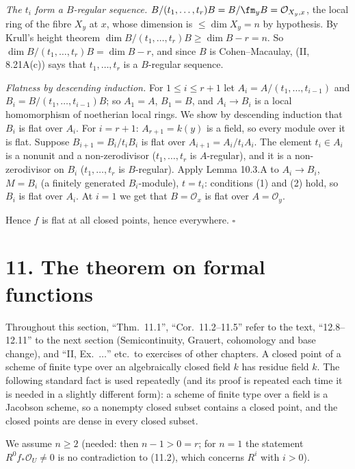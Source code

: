 \documentclass[11pt]{article}
\begin{document}
\emph{The $t_i$ form a $B$-regular sequence.} $B/(t_1,\dots,t_r)B=B/\fm_yB=\mathcal O_{X_y,x}$, the local ring of the fibre $X_y$ at $x$, whose dimension is $\le\dim X_y=n$ by hypothesis. By Krull's height theorem $\dim B/(t_1,\dots,t_r)B\ge\dim B-r=n$. So $\dim B/(t_1,\dots,t_r)B=\dim B-r$, and since $B$ is Cohen--Macaulay, (II, 8.21A(c)) says that $t_1,\dots,t_r$ is a $B$-regular sequence.

\emph{Flatness by descending induction.} For $1\le i\le r+1$ let $A_i=A/(t_1,\dots,t_{i-1})$ and $B_i=B/(t_1,\dots,t_{i-1})B$; so $A_1=A$, $B_1=B$, and $A_i\to B_i$ is a local homomorphism of noetherian local rings. We show by descending induction that $B_i$ is flat over $A_i$. For $i=r+1$: $A_{r+1}=k(y)$ is a field, so every module over it is flat. Suppose $B_{i+1}=B_i/t_iB_i$ is flat over $A_{i+1}=A_i/t_iA_i$. The element $t_i\in A_i$ is a nonunit and a non-zerodivisor ($t_1,\dots,t_r$ is $A$-regular), and it is a non-zerodivisor on $B_i$ ($t_1,\dots,t_r$ is $B$-regular). Apply Lemma 10.3.A to $A_i\to B_i$, $M=B_i$ (a finitely generated $B_i$-module), $t=t_i$: conditions (1) and (2) hold, so $B_i$ is flat over $A_i$. At $i=1$ we get that $B=\mathcal O_x$ is flat over $A=\mathcal O_y$.

Hence $f$ is flat at all closed points, hence everywhere. \hfill$\square$

\section*{11. The theorem on formal functions}

Throughout this section, ``Thm.~11.1'', ``Cor.~11.2--11.5'' refer to the text, ``12.8--12.11'' to the next section (Semicontinuity, Grauert, cohomology and base change), and ``II, Ex.~$\dots$'' etc.\ to exercises of other chapters. A closed point of a scheme of finite type over an algebraically closed field $k$ has residue field $k$. The following standard fact is used repeatedly (and its proof is repeated each time it is needed in a slightly different form): a scheme of finite type over a field is a Jacobson scheme, so a nonempty closed subset contains a closed point, and the closed points are dense in every closed subset.

\pf
We assume $n\ge2$ (needed: then $n-1>0=r$; for $n=1$ the statement $R^{0}f_*\mathcal O_U\ne0$ is no contradiction to (11.2), which concerns $R^i$ with $i>0$).
\end{document}

